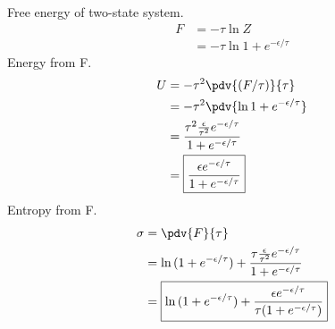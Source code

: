 \documentclass[newpage]{homework}
\begin{document}
\maketitle


\question
Free energy of two-state system.
\begin{align*}
    F	&=	-\tau \ln{Z}	\\
        &=	\boxed{-\tau \ln{1 + e^{-\epsilon/\tau}}}
\end{align*}
Energy from F.
\begin{align*}
    U	&=	-\tau^2 \pdv{(F/\tau)}{\tau}	\\
        &=	-\tau^2	\pdv{\ln{1 + e^{-\epsilon/\tau}}}    \\
        &=	\frac{\tau^2 \frac{\epsilon}{\tau^2}e^{-\epsilon/\tau}}{1+e^{-\epsilon/\tau}}	\\
        &=	\boxed{\frac{\epsilon e^{-\epsilon/\tau}}{1+e^{-\epsilon/\tau}}}
\end{align*}
Entropy from F.
\begin{align*}
    \sigma	&=	\pdv{F}{\tau} 	\\
        &=	\ln{(1+e^{-\epsilon/\tau})} + \frac{\tau \frac{\epsilon}{\tau^2} e^{-\epsilon/\tau}}{1+e^{-\epsilon/\tau}}	\\
        &=	\boxed{\ln{( 1+e^{-\epsilon/\tau})} + \frac{\epsilon e^{-\epsilon/\tau}}{\tau (1 + e^{-\epsilon/\tau})}}
\end{align*}
\end{document}
